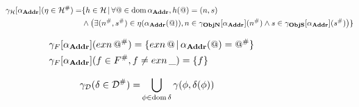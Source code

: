 \begin{figure*}
\begin{align}
\gamma_\H[\alpha_{\Addr}](\eta \in \H^{\#}) =& \{ h \in \H \, | \, \forall@ \in \text{dom}\, \alpha_{\Addr},  h(@) = (n, s) \\
& \wedge \big( \exists(n^{\#}, s^{\#}) \in \eta(\alpha_{\Addr}(@)), n \in \gamma_{\ObjN}[\alpha_{\Addr}](n^{\#}) \wedge s \in \gamma_{\ObjS}[\alpha_{\Addr}](s^{\#}) \big) \} 
\end{align}

\begin{align}
&\gamma_F[\alpha_{\textbf{Addr}}](exn\, @^{\#}) = \{ exn\, @ \, | \, \alpha_{\textbf{Addr}}(@) = @^{\#} \} \\
&\gamma_F[\alpha_{\textbf{Addr}}](f \in F^{\#}, f \neq exn\,\_) = \{ f \}
\end{align}

\begin{align}
\gamma_{\mathcal{D}}(\delta \in \mathcal{D}^{\#}) =& \bigcup_{\phi \in \text{dom}\, \delta} \gamma(\phi, \delta(\phi))
\end{align}

\end{figure*}

